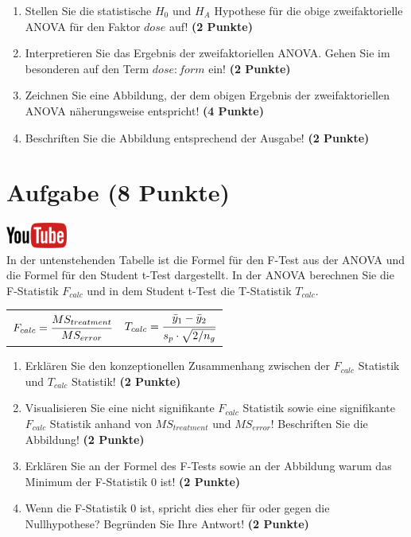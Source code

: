 \documentclass[a4paper, 9pt]{scrartcl}\usepackage[]{graphicx}\usepackage[]{xcolor}
\begin{document}
\begin{enumerate}
\item Stellen Sie die statistische $H_0$ und $H_A$ Hypothese f{\"u}r die obige
  zweifaktorielle ANOVA f{\"u}r den Faktor $dose$
  auf! \textbf{(2 Punkte)}
\item Interpretieren Sie das Ergebnis der zweifaktoriellen ANOVA. Gehen Sie
  im besonderen auf den Term $dose:form$ ein! \textbf{(2 Punkte)}
\item Zeichnen Sie eine Abbildung, der dem obigen Ergebnis der
  zweifaktoriellen ANOVA n{\"a}herungsweise entspricht! \textbf{(4 Punkte)}
\item Beschriften Sie die Abbildung entsprechend der \Rlogo Ausgabe! \textbf{(2 Punkte)}
\end{enumerate}
 
\clearpage

\section{Aufgabe \hfill (8 Punkte)}


\hfill\href{https://youtu.be/FjjJXkFJfIY}{\includegraphics[width =
  2cm]{img/youtube}}\\[1Ex]


In der untenstehenden Tabelle ist die Formel f{\"u}r den F-Test aus der ANOVA
und die Formel f{\"u}r den Student t-Test dargestellt. In der ANOVA berechnen
Sie die F-Statistik $F_{calc}$ und in dem Student t-Test die T-Statistik
$T_{calc}$.

\begin{center}
  \begin{tabular}{cc}
    $F_{calc} = \cfrac{MS_{treatment}}{MS_{error}}$ & $T_{calc} = \cfrac{\bar{y}_1 - \bar{y}_2}{s_p \cdot \sqrt{2/n_g}}$\\
  \end{tabular}
\end{center}


\begin{enumerate}
\item Erkl{\"a}ren Sie den konzeptionellen Zusammenhang zwischen der $F_{calc}$
  Statistik und $T_{calc}$ Statistik! \textbf{(2 Punkte)}
\item Visualisieren Sie eine nicht signifikante $F_{calc}$ Statistik sowie
  eine signifikante $F_{calc}$ Statistik anhand von $MS_{treatment}$ und
  $MS_{error}$! Beschriften Sie die Abbildung! \textbf{(2 Punkte)}
\item Erkl{\"a}ren Sie an der Formel des F-Tests sowie an der Abbildung warum
  das Minimum der F-Statistik 0 ist! \textbf{(2 Punkte)}
\item Wenn die F-Statistik 0 ist, spricht dies eher f{\"u}r oder gegen die
  Nullhypothese? Begr{\"u}nden Sie Ihre Antwort! \textbf{(2 Punkte)}
\end{enumerate}
\end{document}
